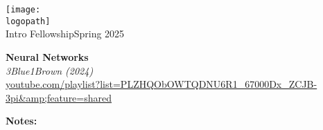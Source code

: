 \documentclass[12pt]{article}
\def\logopath{../assets/caiac_logo.png}
\begin{document}
\thispagestyle{empty} %

\begin{center}
    \texttt{[image: \\logopath]}\\
    \vspace{0.2em}
    {\color{primaryFaded}Intro Fellowship\color{primaryFaded}Spring 2025}
\end{center}

\vspace{1em}

\noindent\textbf{Neural Networks}\\
\textit{3Blue1Brown (2024)}\\
{\small \url{youtube.com/playlist?list=PLZHQObOWTQDNU6R1_67000Dx_ZCJB-3pi&amp;feature=shared}}

\vspace{1em}

\textbf{Notes:}

\vspace{4em}
\end{document}
